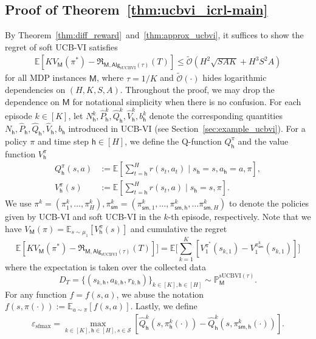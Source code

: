 \documentclass[10pt]{article}
\newcommand{\eps}{\varepsilon}
\newcommand{\<}{\left\langle}
\renewcommand{\>}{\right\rangle}
\newcommand{\E}{\mathbb{E}}
\renewcommand{\P}{\mathbb{P}}
\newcommand{\inst}{{\mathsf{M}}}
\newcommand{\temp}{{\tau}}
\newcommand{\tcO}{{\tilde{\mathcal O}}}
\newcommand{\state}{{s}}
\newcommand{\action}{{a}}
\newcommand{\reward}{{r}}
\newcommand{\totlen}{{T}}
\newcommand{\sAlg}{{\mathsf{Alg}}}
\newcommand{\dset}{{D}}
\newcommand{\plc}{{\pi}}
\newcommand{\optplc}{{\pi^*}}
\newcommand{\Numepi}{{K}}
\newcommand{\horizon}{{H}}
\newcommand{\statesp}{{\mathcal{S}}}
\renewcommand{\horizon}{{H}}
\newcommand{\bonus}{{b}}
\newcommand{\tresttransit}{\widehat{P}}
\newcommand{\init}{{\mu_1}}
\newcommand{\valuefun}{{V}}
\newcommand{\totreward}{{\mathfrak{R}}}
\newcommand{\Numst}{{S}}
\newcommand{\Numact}{{A}}
\newcommand{\Numvi}{{N}}
\newcommand{\Qfun}{{Q}}
\newcommand{\trestQfun}{{\widehat{\Qfun}}}
\newcommand{\Vfun}{{\valuefun}}
\newcommand{\trestVfun}{{\widehat{\Vfun}}}
\newcommand{\sUCBVI}{{\mathrm{sUCBVI}}}
\newcommand{\s}{{\mathsf{sm}}}
\newcommand{\epstemp}{{\eps_{\mathrm{sfmax}}}}
\def\sh{{\mathsf{h}}}
\begin{document}
\subsection{Proof of Theorem~\ref{thm:ucbvi_icrl-main}}\label{sec:pf_thm:ucbvi_icrl-main}
By Theorem~\ref{thm:diff_reward}~and~\ref{thm:approx_ucbvi}, it suffices to show the regret of soft UCB-VI satisfies
\begin{align*}
\E[\Numepi\Vfun_\inst(\plc^*)-\totreward_{\inst,\sAlg_\sUCBVI(\temp)}(\totlen)]\leq \tcO (\horizon^2\sqrt{\Numst\Numact\Numepi}+\horizon^3\Numst^2\Numact)
\end{align*} for all MDP instances $\inst$, where $\temp=1/\Numepi$ and $\tcO(\cdot)$ hides logarithmic dependencies on $(\horizon,\Numepi,\Numst,\Numact)$.
Throughout the proof, we may drop the dependence on $\inst$ for notational simplicity when there is no confusion. For each episode $k\in[\Numepi]$, let $\Numvi^k_\sh,\tresttransit^k_\sh,\trestQfun^k_\sh,\trestVfun^k_\sh,\bonus^k_\sh$ denote the corresponding quantities $\Numvi_\sh,\tresttransit_\sh,\trestQfun_\sh,\trestVfun_\sh,\bonus_\sh$  introduced in UCB-VI (see Section~\ref{sec:example_ucbvi}).
For a policy $\plc$ and time step $\sh\in[\horizon]$, we define the Q-function $\Qfun_\sh^\plc$ and the value function $\Vfun_\sh^\plc$
\begin{align*}
\Qfun_\sh^\plc(\state,\action)&:=\E[\sum_{t=\sh}^\horizon \reward(\state_t,\action_t)\mid \state_\sh=\state,\action_\sh=\action,\plc],\\
\Vfun_\sh^\plc(\state)&:=\E[\sum_{t=\sh}^\horizon \reward(\state_t,\action)\mid \state_\sh=\state,\plc].
\end{align*}
 We use $\plc^{k}=(\plc^k_1,\ldots,\plc^k_\horizon),\plc^k_{\s}=(\plc^k_{\s,1},\ldots,\plc^k_{\s,\sh},\ldots\plc^k_{\s,\horizon})$ to denote the policies given by UCB-VI and soft UCB-VI in the $k$-th episode, respectively. Note that we have $\Vfun_\inst(\plc)=\E_{\state\sim\init}[\Vfun_\sh^\plc(\state)]$ and cumulative the regret
 $$
 \E[\Numepi\Vfun_\inst(\plc^*)-\totreward_{\inst,\sAlg_\sUCBVI(\temp)}(\totlen)]]=\E\Big[\sum_{k=1}^{\Numepi}[\Vfun_1^{\optplc}(\state_{k,1})-\Vfun_1^{\plc^k_{\s}}(\state_{k,1})
 ]\Big]
 $$
 where the expectation is taken over the collected data $$\dset_\totlen=\{(\state_{k,\sh},\action_{k,\sh},\reward_{k,\sh})\}_{k\in[\Numepi],\sh\in[\horizon]}\sim\P_\inst^{\sUCBVI(\temp)}.$$
 For any function $f=f(\state,\action)$, we abuse the notation $f(\state,\plc(
\cdot)):=\E_{\action\sim\plc}[f(\state,\action)]$. Lastly, we define
\begin{align*}
\epstemp=\max_{k\in[\Numepi],\sh\in[\horizon],\state\in\statesp}[\trestQfun^k_\sh(\state,\plc^k_{\sh}(\cdot))-\trestQfun^k_\sh(\state,\plc^k_{\s,\sh}(\cdot)) ].
\end{align*}
\end{document}
